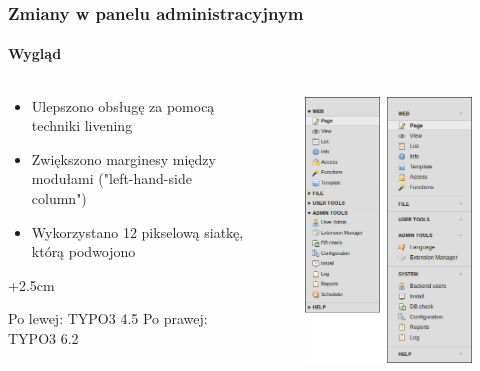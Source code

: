 
\begin{frame}[fragile]
	\frametitle{Zmiany w panelu administracyjnym}
	\framesubtitle{Wygląd}

	\begin{columns}[T]

		\begin{column}{.5\textwidth}
			\begin{itemize}
				\item Ulepszono obsługę za pomocą techniki livening
				\item Zwiększono marginesy między modułami ("left-hand-side column")
				\item Wykorzystano 12 pikselową siatkę, którą podwojono
			\end{itemize}

			\advance\leftskip+2.5cm

			\smaller
				Po lewej: TYPO3 4.5\newline
				Po prawej: TYPO3 6.2
			\normalsize
		\end{column}

		\begin{column}{.5\textwidth}
			\begin{figure}\vspace*{-0.4cm}
				\includegraphics[width=0.6\linewidth]{Images/BackendChanges/VisualAppearance.png}
			\end{figure}
		\end{column}

	\end{columns}

\end{frame}

